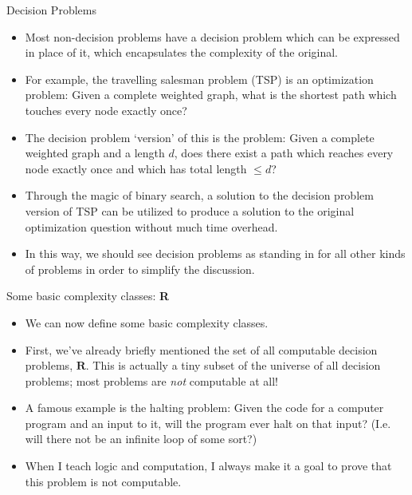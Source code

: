 \documentclass{beamer}
\begin{document}
\begin{frame}{Decision Problems}
    \begin{itemize}
        \item Most non-decision problems have a decision problem which can be expressed in place of it, which encapsulates the complexity of the original. \pause 
        \item For example, the travelling salesman problem (TSP) is an optimization problem: Given a complete weighted graph, what is the shortest path which touches every node exactly once? \pause
        \item The decision problem `version' of this is the problem: Given a complete weighted graph and a length $d$, does there exist a path which reaches every node exactly once and which has total length $\leq d$? \pause 
        \item Through the magic of binary search, a solution to the decision problem version of TSP can be utilized to produce a solution to the original optimization question without much time overhead. \pause 
        \item In this way, we should see decision problems as standing in for all other kinds of problems in order to simplify the discussion. 
    \end{itemize}
\end{frame}

\begin{frame}{Some basic complexity classes: \textbf{R}}
    \begin{itemize}
        \item We can now define some basic complexity classes. 
        \item First, we've already briefly mentioned the set of all computable decision problems, $\mathbf{R}$. This is actually a tiny subset of the universe of all decision problems; most problems are \emph{not} computable at all! \pause 
        \item A famous example is the halting problem: Given the code for a computer program and an input to it, will the program ever halt on that input? (I.e. will there not be an infinite loop of some sort?) 
        \item When I teach logic and computation, I always make it a goal to prove that this problem is not computable. 
    \end{itemize}
\end{frame}
\end{document}
